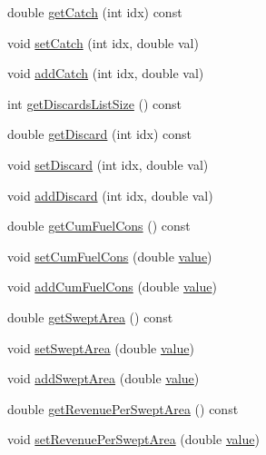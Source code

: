 \begin{DoxyCompactItemize}
double \mbox{\hyperlink{class_vessel_data_a64e1cbc37eae7b5a57bf63a5f39f430a}{get\+Catch}} (int idx) const
\item 
void \mbox{\hyperlink{class_vessel_data_aed1a3ec8e7eae38dd0f384b94a47147b}{set\+Catch}} (int idx, double val)
\item 
void \mbox{\hyperlink{class_vessel_data_a31136cd85b5a2d8e75f85c4f14374c06}{add\+Catch}} (int idx, double val)
\item 
int \mbox{\hyperlink{class_vessel_data_a1f0475215511f5cd974af692eb167baa}{get\+Discards\+List\+Size}} () const
\item 
double \mbox{\hyperlink{class_vessel_data_af973c2e441f11e74274c467ec200c032}{get\+Discard}} (int idx) const
\item 
void \mbox{\hyperlink{class_vessel_data_ad452b1f11f927a309b3a955b61b24151}{set\+Discard}} (int idx, double val)
\item 
void \mbox{\hyperlink{class_vessel_data_aa0509d3bf8bf1b10ece1baa52086cd23}{add\+Discard}} (int idx, double val)
\item 
double \mbox{\hyperlink{class_vessel_data_ae89bf2046c405e5a7374ae84b9d1cbda}{get\+Cum\+Fuel\+Cons}} () const
\item 
void \mbox{\hyperlink{class_vessel_data_a73f432263d3c69ee879232b8208dfd69}{set\+Cum\+Fuel\+Cons}} (double \mbox{\hyperlink{diffusion_8cpp_a4b41795815d9f3d03abfc739e666d5da}{value}})
\item 
void \mbox{\hyperlink{class_vessel_data_a11db24b09ad9640e483bc5a1485a3b67}{add\+Cum\+Fuel\+Cons}} (double \mbox{\hyperlink{diffusion_8cpp_a4b41795815d9f3d03abfc739e666d5da}{value}})
\item 
double \mbox{\hyperlink{class_vessel_data_a15988c733658a2aeb3ec67222aa15519}{get\+Swept\+Area}} () const
\item 
void \mbox{\hyperlink{class_vessel_data_a8084326378623668bf88d0ac97ce2f54}{set\+Swept\+Area}} (double \mbox{\hyperlink{diffusion_8cpp_a4b41795815d9f3d03abfc739e666d5da}{value}})
\item 
void \mbox{\hyperlink{class_vessel_data_a2c29a06b79edea56aa337be55470a658}{add\+Swept\+Area}} (double \mbox{\hyperlink{diffusion_8cpp_a4b41795815d9f3d03abfc739e666d5da}{value}})
\item 
double \mbox{\hyperlink{class_vessel_data_a2f2d6847fe7e22eb832781d293d22298}{get\+Revenue\+Per\+Swept\+Area}} () const
\item 
void \mbox{\hyperlink{class_vessel_data_ad88f8d9af2a0fcedb5a27429a1dfde07}{set\+Revenue\+Per\+Swept\+Area}} (double \mbox{\hyperlink{diffusion_8cpp_a4b41795815d9f3d03abfc739e666d5da}{value}})

\end{DoxyCompactItemize}
